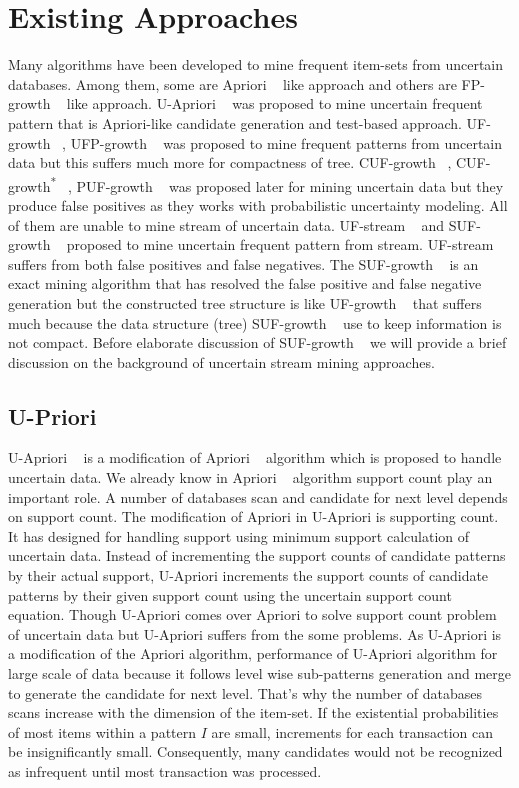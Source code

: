 \section{Existing Approaches}
Many algorithms have been developed to mine frequent item-sets from uncertain databases. Among them, some are Apriori ~\cite{apriori} like approach and others are FP-growth ~\cite{fp_growth} like approach. U-Apriori ~\cite{u_priori} was proposed to mine uncertain frequent pattern that is Apriori-like candidate generation and test-based approach. UF-growth ~\cite{uf_growth}, UFP-growth ~\cite{ufp_growth} was proposed to mine frequent patterns from uncertain data but this suffers much more for compactness of tree. CUF-growth ~\cite{cuf_growth}, CUF-growth\textsuperscript{*} ~\cite{cuf_growth}, PUF-growth ~\cite{cuf_growth} was proposed later for mining uncertain data but they produce false positives as they works with probabilistic uncertainty modeling. All of them are unable to mine stream of uncertain data. UF-stream ~\cite{suf_growth} and SUF-growth ~\cite{suf_growth} proposed to mine uncertain frequent pattern from stream. UF-stream ~\cite{suf_growth} suffers from both false positives and false negatives. The SUF-growth ~\cite{suf_growth} is an exact mining algorithm that has resolved the false positive and false negative generation but the constructed tree structure is like UF-growth ~\cite{uf_growth} that suffers much because the data structure (tree) SUF-growth ~\cite{suf_growth} use to keep information is not compact. Before elaborate discussion of SUF-growth ~\cite{suf_growth} we will provide a brief discussion on the background of uncertain stream mining approaches.
    
    
    \subsection{U-Priori}
    U-Apriori ~\cite{u_priori} is a modification of Apriori ~\cite{apriori} algorithm which is proposed to handle uncertain data. We already know in Apriori ~\cite{apriori} algorithm support count play an important role. A number of databases scan and candidate for next level depends on support count. The modification of Apriori in U-Apriori is supporting count. It has designed for handling support using minimum support calculation of uncertain data. Instead of incrementing the support counts of candidate patterns by their actual support, U-Apriori increments the support counts of candidate patterns by their given support count using the uncertain support count equation. Though U-Apriori comes over Apriori to solve support count problem of uncertain data but U-Apriori suffers from the some problems. As U-Apriori is a modification of the Apriori algorithm, performance of U-Apriori algorithm for large scale of data because it follows level wise sub-patterns generation and merge to generate the candidate for next level. That's why the number of databases scans increase with the dimension of the item-set. If the existential probabilities of most items within a pattern $I$ are small, increments for each transaction can be insignificantly small. Consequently, many candidates would not be recognized as infrequent until most transaction was processed.  
    
